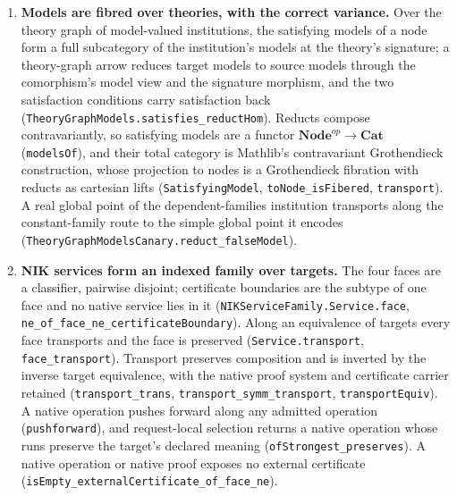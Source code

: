 \documentclass[11pt]{article}
\theoremstyle{definition}
\theoremstyle{remark}
\begin{document}
\begin{enumerate}
  (\nolinkurl{InstitutionConsequence.consequenceFunctor}).  Closed theories over
  varying institutions form the theory graph, constructed as Mathlib's
  Grothendieck construction of the direct-image functor of closed theories
  (\nolinkurl{TheoryGraph.closedTheories}); the closed theories of one
  institution embed faithfully as its fibre, and every arrow has a semantic
  target reading (\nolinkurl{TheoryGraph.semanticTargetFunctor}).
\item \textbf{Models are fibred over theories, with the correct variance.}
  Over the theory graph of model-valued institutions, the satisfying models
  of a node form a full subcategory of the institution's models at the
  theory's signature; a theory-graph arrow reduces target models to source
  models through the comorphism's model view and the signature morphism, and
  the two satisfaction conditions carry satisfaction back
  (\nolinkurl{TheoryGraphModels.satisfies_reductHom}).  Reducts compose
  contravariantly, so satisfying models are a functor
  $\mathbf{Node}^{op}\to\mathbf{Cat}$ (\texttt{modelsOf}), and their total
  category is Mathlib's contravariant Grothendieck construction, whose
  projection to nodes is a Grothendieck fibration with reducts as cartesian
  lifts (\texttt{SatisfyingModel}, \texttt{toNode\_isFibered},
  \texttt{transport}).  A real global point of the dependent-families
  institution transports along the constant-family route to the simple
  global point it encodes (\nolinkurl{TheoryGraphModelsCanary.reduct_falseModel}).
\item \textbf{NIK services form an indexed family over targets.} The
  four faces are a classifier, pairwise disjoint; certificate boundaries are
  the subtype of one face and no native service lies in it
  (\nolinkurl{NIKServiceFamily.Service.face},
  \nolinkurl{ne_of_face_ne_certificateBoundary}).  Along an equivalence of
  targets every face transports and the face is preserved
  (\texttt{Service.transport}, \texttt{face\_transport}). Transport preserves
  composition and is inverted by the inverse target equivalence, with the
  native proof system and certificate carrier retained
  (\texttt{transport\_trans}, \nolinkurl{transport_symm_transport},
  \texttt{transportEquiv}). A native operation
  pushes forward along any admitted operation (\texttt{pushforward}), and
  request-local selection returns a native operation whose runs preserve the
  target's declared meaning (\nolinkurl{ofStrongest_preserves}).  A native
  operation or native proof exposes no external certificate
  (\nolinkurl{isEmpty_externalCertificate_of_face_ne}).

\end{enumerate}
\end{document}
